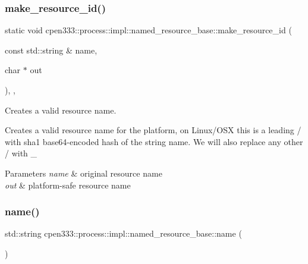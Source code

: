 \subsubsection{\texorpdfstring{make\+\_\+resource\+\_\+id()}{make\_resource\_id()}}
{\footnotesize\ttfamily static void cpen333\+::process\+::impl\+::named\+\_\+resource\+\_\+base\+::make\+\_\+resource\+\_\+id (\begin{DoxyParamCaption}\item[{const std\+::string \&}]{name,  }\item[{char $\ast$}]{out }\end{DoxyParamCaption})\hspace{0.3cm}{\ttfamily [inline]}, {\ttfamily [static]}, {\ttfamily [protected]}}



Creates a valid resource name. 

Creates a valid resource name for the platform, on Linux/\+O\+SX this is a leading \textquotesingle{}/\textquotesingle{} with sha1 base64-\/encoded hash of the string name. We will also replace any other \textquotesingle{}/\textquotesingle{} with \textquotesingle{}\+\_\+\textquotesingle{} 
\begin{DoxyParams}{Parameters}
{\em name} & original resource name \\
\hline
{\em out} & platform-\/safe resource name \\
\hline
\end{DoxyParams}
\mbox{\label{classcpen333_1_1process_1_1impl_1_1named__resource__base_a53986a0a1dd26a3602b842c45613b79d}} 
\subsubsection{\texorpdfstring{name()}{name()}}
{\footnotesize\ttfamily std\+::string cpen333\+::process\+::impl\+::named\+\_\+resource\+\_\+base\+::name (\begin{DoxyParamCaption}{ }\end{DoxyParamCaption})\hspace{0.3cm}{\ttfamily [inline]}}



